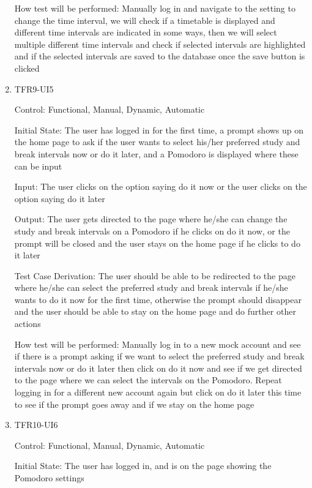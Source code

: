 \documentclass[12pt, titlepage]{article}
\begin{document}
\begin{enumerate}[resume]
  How test will be performed: Manually log in and navigate to the setting to change the time interval, we will check if a timetable is displayed and  different time intervals are indicated in some ways, then we will select multiple different time intervals and check if selected intervals are highlighted and if the selected intervals are saved to the database once the save button is clicked 
  
  
  \item{TFR9-UI5\\} \label{TFR9-UI5}
  
  Control: Functional, Manual, Dynamic, Automatic
            
  Initial State: The user has logged in for the first time, a prompt shows up on the home page to ask if the user wants to select his/her preferred study and break intervals now or do it later, and a Pomodoro is displayed where these can be input
            
  Input: The user clicks on the option saying do it now or the user clicks on the option saying do it later
            
  Output: The user gets directed to the page where he/she can change the study and break intervals on a Pomodoro if he clicks on do it now, or the prompt will be closed and the user stays on the home page if he clicks to do it later
  
  Test Case Derivation: The user should be able to be redirected to the page where he/she can select the preferred study and break intervals if he/she wants to do it now for the first time, otherwise the prompt should disappear and the user should be able to stay on the home page and do further other actions
            
  How test will be performed: Manually log in to a new mock account and see if there is a prompt asking if we want to select the preferred study and break intervals now or do it later then click on do it now and see if we get directed to the page where we can select the intervals on the Pomodoro. Repeat logging in for a different new account again but click on do it later this time to see if the prompt goes away and if we stay on the home page
            
  \item{TFR10-UI6\\} \label{TFR10-UI6}
  
  Control: Functional, Manual, Dynamic, Automatic
            
  Initial State: The user has logged in, and is on the page showing the Pomodoro settings
            

\end{enumerate}
\end{document}
